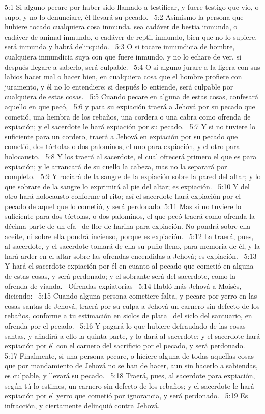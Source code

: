 5:1 Si alguno pecare por haber sido llamado a testificar, y fuere testigo que vio, o supo, y no lo denunciare, él llevará su pecado.  
5:2 Asimismo la persona que hubiere tocado cualquiera cosa inmunda, sea cadáver de bestia inmunda, o cadáver de animal inmundo, o cadáver de reptil inmundo, bien que no lo supiere, será inmunda y habrá delinquido.  
5:3 O si tocare inmundicia de hombre, cualquiera inmundicia suya con que fuere inmundo, y no lo echare de ver, si después llegare a saberlo, será culpable.  
5:4 O si alguno jurare a la ligera con sus labios hacer mal o hacer bien, en cualquiera cosa que el hombre profiere con juramento, y él no lo entendiere; si después lo entiende, será culpable por cualquiera de estas cosas.  
5:5 Cuando pecare en alguna de estas cosas, confesará aquello en que pecó,  
5:6 y para su expiación traerá a Jehová por su pecado que cometió, una hembra de los rebaños, una cordera o una cabra como ofrenda de expiación; y el sacerdote le hará expiación por su pecado.  
5:7 Y si no tuviere lo suficiente para un cordero, traerá a Jehová en expiación por su pecado que cometió, dos tórtolas o dos palominos, el uno para expiación, y el otro para holocausto.  
5:8 Y los traerá al sacerdote, el cual ofrecerá primero el que es para expiación; y le arrancará de su cuello la cabeza, mas no la separará por completo.  
5:9 Y rociará de la sangre de la expiación sobre la pared del altar; y lo que sobrare de la sangre lo exprimirá al pie del altar; es expiación.  
5:10 Y del otro hará holocausto conforme al rito; así el sacerdote hará expiación por el pecado de aquel que lo cometió, y será perdonado. 
5:11 Mas si no tuviere lo suficiente para dos tórtolas, o dos palominos, el que pecó traerá como ofrenda la décima parte de un efa  de flor de harina para expiación. No pondrá sobre ella aceite, ni sobre ella pondrá incienso, porque es expiación.  
5:12 La traerá, pues, al sacerdote, y el sacerdote tomará de ella su puño lleno, para memoria de él, y la hará arder en el altar sobre las ofrendas encendidas a Jehová; es expiación.  
5:13 Y hará el sacerdote expiación por él en cuanto al pecado que cometió en alguna de estas cosas, y será perdonado; y el sobrante será del sacerdote, como la ofrenda de vianda.  
Ofrendas expiatorias  
5:14 Habló más Jehová a Moisés, diciendo:  
5:15 Cuando alguna persona cometiere falta, y pecare por yerro en las cosas santas de Jehová, traerá por su culpa a Jehová un carnero sin defecto de los rebaños, conforme a tu estimación en siclos de plata  del siclo del santuario, en ofrenda por el pecado.  
5:16 Y pagará lo que hubiere defraudado de las cosas santas, y añadirá a ello la quinta parte, y lo dará al sacerdote; y el sacerdote hará expiación por él con el carnero del sacrificio por el pecado, y será perdonado.  
5:17 Finalmente, si una persona pecare, o hiciere alguna de todas aquellas cosas que por mandamiento de Jehová no se han de hacer, aun sin hacerlo a sabiendas, es culpable, y llevará su pecado.  
5:18 Traerá, pues, al sacerdote para expiación, según tú lo estimes, un carnero sin defecto de los rebaños; y el sacerdote le hará expiación por el yerro que cometió por ignorancia, y será perdonado.  
5:19 Es infracción, y ciertamente delinquió contra Jehová.  
